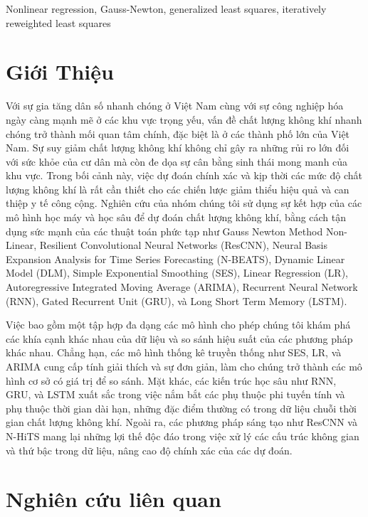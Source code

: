 \documentclass[conference]{IEEEtran}
\begin{document}
\begin{IEEEkeywords}
    Nonlinear regression, Gauss-Newton, generalized least squares, iteratively reweighted least
    squares
\end{IEEEkeywords}

\section{Giới Thiệu}
Với sự gia tăng dân số nhanh chóng ở Việt Nam cùng với sự công nghiệp hóa ngày càng mạnh mẽ ở các khu vực trọng yếu, vấn đề chất lượng không khí nhanh chóng trở thành mối quan tâm chính, đặc biệt là ở các thành phố lớn của Việt Nam. Sự suy giảm chất lượng không khí không chỉ gây ra những rủi ro lớn đối với sức khỏe của cư dân mà còn đe dọa sự cân bằng sinh thái mong manh của khu vực. Trong bối cảnh này, việc dự đoán chính xác và kịp thời các mức độ chất lượng không khí là rất cần thiết cho các chiến lược giảm thiểu hiệu quả và can thiệp y tế công cộng. Nghiên cứu của nhóm chúng tôi sử dụng sự kết hợp của các mô hình học máy và học sâu để dự đoán chất lượng không khí, bằng cách tận dụng sức mạnh của các thuật toán phức tạp như Gauss Newton Method Non-Linear, Resilient Convolutional Neural Networks (ResCNN), Neural Basis Expansion Analysis for Time Series Forecasting (N-BEATS), Dynamic Linear Model (DLM), Simple Exponential Smoothing (SES), Linear Regression (LR), Autoregressive Integrated Moving Average (ARIMA), Recurrent Neural Network (RNN), Gated Recurrent Unit (GRU), và Long Short Term Memory (LSTM).

Việc bao gồm một tập hợp đa dạng các mô hình cho phép chúng tôi khám phá các khía cạnh khác nhau của dữ liệu và so sánh hiệu suất của các phương pháp khác nhau. Chẳng hạn, các mô hình thống kê truyền thống như SES, LR, và ARIMA cung cấp tính giải thích và sự đơn giản, làm cho chúng trở thành các mô hình cơ sở có giá trị để so sánh. Mặt khác, các kiến trúc học sâu như RNN, GRU, và LSTM xuất sắc trong việc nắm bắt các phụ thuộc phi tuyến tính và phụ thuộc thời gian dài hạn, những đặc điểm thường có trong dữ liệu chuỗi thời gian chất lượng không khí. Ngoài ra, các phương pháp sáng tạo như ResCNN và N-HiTS mang lại những lợi thế độc đáo trong việc xử lý các cấu trúc không gian và thứ bậc trong dữ liệu, nâng cao độ chính xác của các dự đoán.

\section{Nghiên cứu liên quan}
\end{document}
